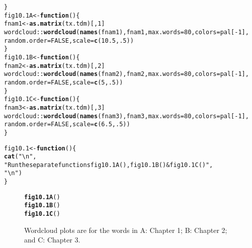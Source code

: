 \documentclass[12pt, a4paper,  BCOR=8.25mm, DIV=15]{scrartcl}\usepackage[]{graphicx}\usepackage[]{color}
\makeatletter
\newcommand{\hlnum}[1]{\textcolor[rgb]{0.686,0.059,0.569}{#1}}%
\newcommand{\hlstr}[1]{\textcolor[rgb]{0.192,0.494,0.8}{#1}}%
\newcommand{\hlopt}[1]{\textcolor[rgb]{0,0,0}{#1}}%
\newcommand{\hlstd}[1]{\textcolor[rgb]{0.345,0.345,0.345}{#1}}%
\newcommand{\hlkwa}[1]{\textcolor[rgb]{0.161,0.373,0.58}{\textbf{#1}}}%
\newcommand{\hlkwb}[1]{\textcolor[rgb]{0.69,0.353,0.396}{#1}}%
\newcommand{\hlkwc}[1]{\textcolor[rgb]{0.333,0.667,0.333}{#1}}%
\newcommand{\hlkwd}[1]{\textcolor[rgb]{0.737,0.353,0.396}{\textbf{#1}}}%
\newenvironment{kframe}{%
 \def\at@end@of@kframe{}%
 \ifinner\ifhmode%
  \def\at@end@of@kframe{\end{minipage}}%
  \begin{minipage}{\columnwidth}%
 \fi\fi%
 \def\FrameCommand##1{\hskip\@totalleftmargin \hskip-\fboxsep
 \colorbox{shadecolor}{##1}\hskip-\fboxsep
     \hskip-\linewidth \hskip-\@totalleftmargin \hskip\columnwidth}%
 \MakeFramed {\advance\hsize-\width
   \@totalleftmargin\z@ \linewidth\hsize
   \@setminipage}}%
 {\par\unskip\endMakeFramed%
 \at@end@of@kframe}
\newenvironment{knitrout}{}{} %
\makeatother
\begin{document}
\begin{knitrout}
\begin{kframe}
\begin{alltt}
\hlstd{\}}
\hlstd{fig10.1A} \hlkwb{<-} \hlkwa{function}\hlstd{()\{}
\hlstd{fnam1} \hlkwb{<-} \hlkwd{as.matrix}\hlstd{(tx.tdm)[,}\hlnum{1}\hlstd{]}
\hlstd{wordcloud}\hlopt{::}\hlkwd{wordcloud}\hlstd{(}\hlkwd{names}\hlstd{(fnam1), fnam1,} \hlkwc{max.words}\hlstd{=}\hlnum{80}\hlstd{,} \hlkwc{colors}\hlstd{=pal[}\hlopt{-}\hlnum{1}\hlstd{],}
          \hlkwc{random.order}\hlstd{=}\hlnum{FALSE}\hlstd{,} \hlkwc{scale}\hlstd{=}\hlkwd{c}\hlstd{(}\hlnum{10.5}\hlstd{,}\hlnum{.5}\hlstd{))}
\hlstd{\}}
\hlstd{fig10.1B} \hlkwb{<-} \hlkwa{function}\hlstd{()\{}
\hlstd{fnam2} \hlkwb{<-} \hlkwd{as.matrix}\hlstd{(tx.tdm)[,}\hlnum{2}\hlstd{]}
\hlstd{wordcloud}\hlopt{::}\hlkwd{wordcloud}\hlstd{(}\hlkwd{names}\hlstd{(fnam2), fnam2,} \hlkwc{max.words}\hlstd{=}\hlnum{80}\hlstd{,} \hlkwc{colors}\hlstd{=pal[}\hlopt{-}\hlnum{1}\hlstd{],}
          \hlkwc{random.order}\hlstd{=}\hlnum{FALSE}\hlstd{,} \hlkwc{scale}\hlstd{=}\hlkwd{c}\hlstd{(}\hlnum{5}\hlstd{,}\hlnum{.5}\hlstd{))}
\hlstd{\}}
\hlstd{fig10.1C} \hlkwb{<-} \hlkwa{function}\hlstd{()\{}
\hlstd{fnam3} \hlkwb{<-} \hlkwd{as.matrix}\hlstd{(tx.tdm)[,}\hlnum{3}\hlstd{]}
\hlstd{wordcloud}\hlopt{::}\hlkwd{wordcloud}\hlstd{(}\hlkwd{names}\hlstd{(fnam3), fnam3,} \hlkwc{max.words}\hlstd{=}\hlnum{80}\hlstd{,} \hlkwc{colors}\hlstd{=pal[}\hlopt{-}\hlnum{1}\hlstd{],}
          \hlkwc{random.order}\hlstd{=}\hlnum{FALSE}\hlstd{,} \hlkwc{scale}\hlstd{=}\hlkwd{c}\hlstd{(}\hlnum{6.5}\hlstd{,}\hlnum{.5}\hlstd{))}
\hlstd{\}}
\end{alltt}
\end{kframe}
\end{knitrout}

\begin{knitrout}
\color{fgcolor}\begin{kframe}
\begin{alltt}
\hlstd{fig10.1} \hlkwb{<-} \hlkwa{function}\hlstd{()\{}
    \hlkwd{cat}\hlstd{(}\hlstr{"\textbackslash{}n"}\hlstd{,}
        \hlstr{"Run the separate functions fig10.1A(), fig10.1B() & fig10.1C()"}\hlstd{,}
        \hlstr{"\textbackslash{}n"}\hlstd{)}
\hlstd{\}}
\end{alltt}
\end{kframe}
\end{knitrout}

\begin{figure}
\begin{knitrout}
\color{fgcolor}\begin{kframe}
\begin{alltt}
\hlkwd{fig10.1A}\hlstd{()}
\hlkwd{fig10.1B}\hlstd{()}
\hlkwd{fig10.1C}\hlstd{()}
\end{alltt}
\end{kframe}
\end{knitrout}

\caption{Wordcloud plots are for the words in A: Chapter 1; B: Chapter 2; and C: Chapter 3.\label{fig:wc}}
\end{figure}
\end{document}
